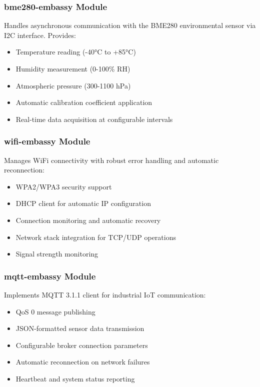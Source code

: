 \documentclass[12pt,a4paper]{article}
\begin{document}
\subsubsection{bme280-embassy Module}
Handles asynchronous communication with the BME280 environmental sensor via I2C interface. Provides:
\begin{itemize}
    \item Temperature reading (-40°C to +85°C)
    \item Humidity measurement (0-100\% RH)
    \item Atmospheric pressure (300-1100 hPa)
    \item Automatic calibration coefficient application
    \item Real-time data acquisition at configurable intervals
\end{itemize}

\subsubsection{wifi-embassy Module}
Manages WiFi connectivity with robust error handling and automatic reconnection:
\begin{itemize}
    \item WPA2/WPA3 security support
    \item DHCP client for automatic IP configuration
    \item Connection monitoring and automatic recovery
    \item Network stack integration for TCP/UDP operations
    \item Signal strength monitoring
\end{itemize}

\subsubsection{mqtt-embassy Module}
Implements MQTT 3.1.1 client for industrial IoT communication:
\begin{itemize}
    \item QoS 0 message publishing
    \item JSON-formatted sensor data transmission
    \item Configurable broker connection parameters
    \item Automatic reconnection on network failures
    \item Heartbeat and system status reporting
\end{itemize}
\end{document}
